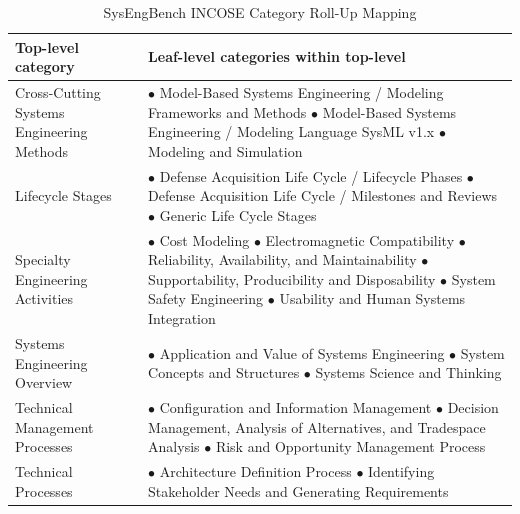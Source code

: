 \begin{table}[htbp]
\centering
\caption{SysEngBench INCOSE Category Roll-Up Mapping}
\label{tab:sysengbench_category_rollup}
\small
\renewcommand{\arraystretch}{1.15}
\begin{tabular}{p{4.2cm} p{10.2cm}}
\toprule
\textbf{Top-level category} & \textbf{Leaf-level categories within top-level} \\
\midrule
Cross-Cutting Systems Engineering Methods &
$\bullet$ Model-Based Systems Engineering / Modeling Frameworks and Methods \newline
$\bullet$ Model-Based Systems Engineering / Modeling Language SysML v1.x \newline
$\bullet$ Modeling and Simulation \\
\midrule
Lifecycle Stages &
$\bullet$ Defense Acquisition Life Cycle / Lifecycle Phases \newline
$\bullet$ Defense Acquisition Life Cycle / Milestones and Reviews \newline
$\bullet$ Generic Life Cycle Stages \\
\midrule
Specialty Engineering Activities &
$\bullet$ Cost Modeling \newline
$\bullet$ Electromagnetic Compatibility \newline
$\bullet$ Reliability, Availability, and Maintainability \newline
$\bullet$ Supportability, Producibility and Disposability \newline
$\bullet$ System Safety Engineering \newline
$\bullet$ Usability and Human Systems Integration \\
\midrule
Systems Engineering Overview &
$\bullet$ Application and Value of Systems Engineering \newline
$\bullet$ System Concepts and Structures \newline
$\bullet$ Systems Science and Thinking \\
\midrule
Technical Management Processes &
$\bullet$ Configuration and Information Management \newline
$\bullet$ Decision Management, Analysis of Alternatives, and Tradespace Analysis \newline
$\bullet$ Risk and Opportunity Management Process \\
\midrule
Technical Processes &
$\bullet$ Architecture Definition Process \newline
$\bullet$ Identifying Stakeholder Needs and Generating Requirements \\
\bottomrule
\end{tabular}
\end{table}

